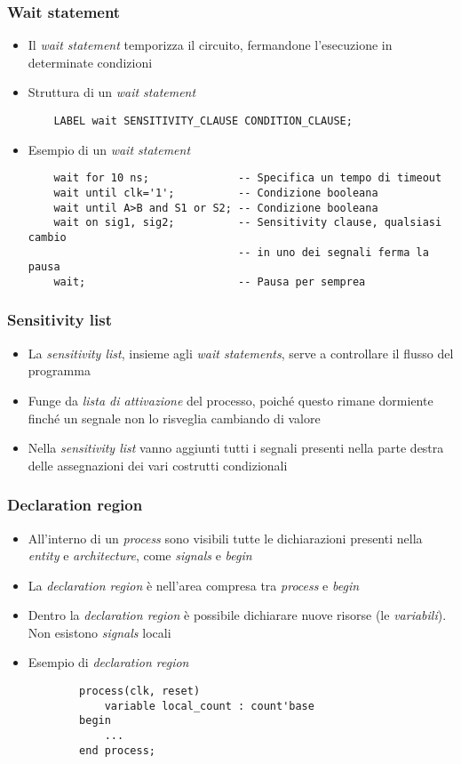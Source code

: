 \documentclass{article}
\begin{document}
\subsubsection{Wait statement}
\begin{itemize}
	\item Il \textit{wait statement} temporizza il circuito, fermandone l'esecuzione in determinate condizioni
	\item Struttura di un \textit{wait statement}
	      \begin{verbatim}
    LABEL wait SENSITIVITY_CLAUSE CONDITION_CLAUSE;
	      \end{verbatim}
	\item Esempio di un \textit{wait statement}
	      \begin{verbatim}
    wait for 10 ns;              -- Specifica un tempo di timeout
    wait until clk='1';          -- Condizione booleana
    wait until A>B and S1 or S2; -- Condizione booleana
    wait on sig1, sig2;          -- Sensitivity clause, qualsiasi cambio
                                 -- in uno dei segnali ferma la pausa
    wait;                        -- Pausa per semprea
	      \end{verbatim} 
\end{itemize}
\subsubsection{Sensitivity list}
\begin{itemize}
	\item La \textit{sensitivity list}, insieme agli \textit{wait statements}, serve a controllare il flusso del programma
	\item Funge da \textit{lista di attivazione} del processo, poiché questo rimane dormiente finché un segnale non lo risveglia cambiando di valore
	\item Nella \textit{sensitivity list} vanno aggiunti tutti i segnali presenti nella parte destra delle assegnazioni dei vari costrutti condizionali
\end{itemize}
\subsubsection{Declaration region}
\begin{itemize}
	\item All'interno di un \textit{process} sono visibili tutte le dichiarazioni presenti nella \textit{entity} e \textit{architecture}, come \textit{signals} e \textit{begin}
	\item La \textit{declaration region} è nell'area compresa tra \textit{process} e \textit{begin}
	\item Dentro la \textit{declaration region} è possibile dichiarare nuove risorse (le \textit{variabili}). Non esistono \textit{signals} locali
	\item Esempio di \textit{declaration region}
	      \begin{verbatim}
	    process(clk, reset)
	        variable local_count : count'base
	    begin
        	...
	    end process;
	      \end{verbatim}
\end{itemize}
\end{document}
